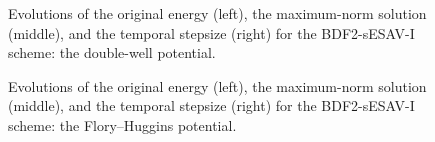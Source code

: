 \documentclass{m2an}
\begin{document}
\begin{figure}[!htbp]
	\vspace{-10pt}
	\centering
	\setlength{\abovecaptionskip}{0.0cm} 
	\setlength{\belowcaptionskip}{0.0cm}
	\caption{Evolutions of the original energy (left), the maximum-norm solution (middle), and the temporal stepsize (right) for the BDF2-sESAV-I scheme: the double-well potential.}
	\label{figEx2_5}
	\vspace{-10pt}
\end{figure}
%
\begin{figure}[!htbp]
	\vspace{-10pt}
	\centering
	\setlength{\abovecaptionskip}{0.0cm} 
	\setlength{\belowcaptionskip}{0.0cm}
	\caption{Evolutions of the original energy (left), the maximum-norm solution (middle), and the temporal stepsize (right)  for the BDF2-sESAV-I scheme: the Flory--Huggins potential.}
	\label{figEx2_6}
	\vspace{-10pt}
\end{figure}
\end{document}
